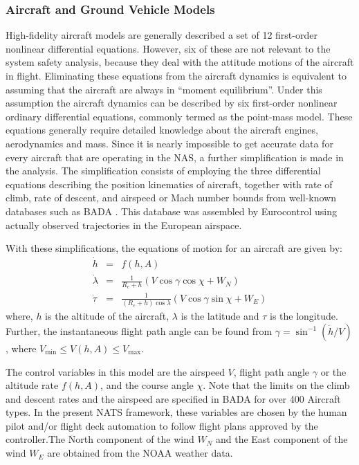 \documentclass[11pt]{book}              %
\begin{document}
\subsubsection{Aircraft and Ground Vehicle Models}
High-fidelity aircraft models are generally described a set of 12 first-order nonlinear differential equations. However, six of these are not relevant to the system safety analysis,
because they deal with the attitude motions of the aircraft in flight. Eliminating these equations from the aircraft dynamics is equivalent to assuming that the aircraft are always in “moment equilibrium”. Under this assumption the aircraft dynamics can be described by six first-order nonlinear ordinary differential equations, commonly termed as the point-mass model. These equations generally require detailed knowledge about the aircraft engines, aerodynamics
and mass.
Since it is nearly impossible to get accurate data for every
aircraft that are operating in the NAS, a further
simplification is made in the analysis. The simplification
consists of employing the three differential equations
describing the position kinematics of aircraft, together with
rate of climb, rate of descent, and airspeed or Mach number
bounds from well-known databases such as BADA \cite{BADA}. This database was assembled by
Eurocontrol using actually observed trajectories in the
European airspace.\par
With these simplifications, the equations of motion for an
aircraft are given by:
\begin{eqnarray}
\dot{h} &=&f(h,A)\\
\dot{\lambda}&=& \frac{1}{R_e+h}\left( V\cos\gamma\cos\chi+W_N \right)\\
\dot{\tau} &=& \frac{1}{(R_e+h)\cos\lambda}\left( V\cos\gamma\sin\chi+W_E \right)
\end{eqnarray}
where, $h$ is the altitude of the aircraft, $\lambda$ is the latitude and $\tau$ is the longitude. Further, the instantaneous flight path angle can be found from $\gamma = \sin^{-1}(\dot{h}/V)$, where $V_{\min}\leq V(h,A)\leq V_{\max}$.\par

The control variables in this model are the airspeed $V$, flight path angle $\gamma$ or the altitude rate $f(h,A)$, and the course angle $\chi$. Note that the limits on the climb and descent rates and the airspeed are specified in BADA for over 400 Aircraft types. In the present NATS framework, these variables are chosen by the human pilot and/or flight deck
automation to follow flight plans approved by the controller.The North component of the wind $W_N$ and the East component of the wind $W_E$ are obtained from the NOAA weather data.\par
\end{document}
